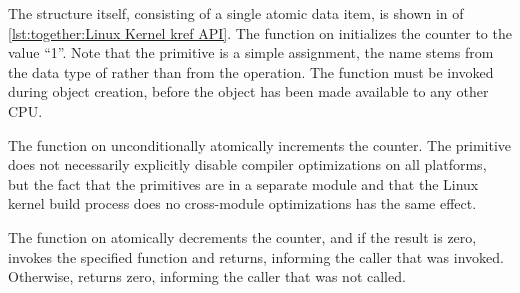 \begin{fcvref}
The  structure itself, consisting of a single atomic
data item, is shown in  of
\cref{lst:together:Linux Kernel kref API}.
The  function on 
initializes the counter to the value ``1''.
Note that the  primitive is a simple
assignment, the name stems from the data type of 
rather than from the operation.
The  function must be invoked during object creation,
before the object has been made available to any other CPU\@.

The  function on 
unconditionally atomically increments the counter.
The  primitive does not necessarily explicitly
disable compiler
optimizations on all platforms, but the fact that the 
primitives are in a separate module and that the Linux kernel build
process does no cross-module optimizations has the same effect.

The  function on 
atomically decrements the
counter, and if the result is zero,  invokes the specified
 function and  returns, informing the caller
that  was invoked.
Otherwise,  returns zero, informing the caller that
 was not called.
\end{fcvref}

